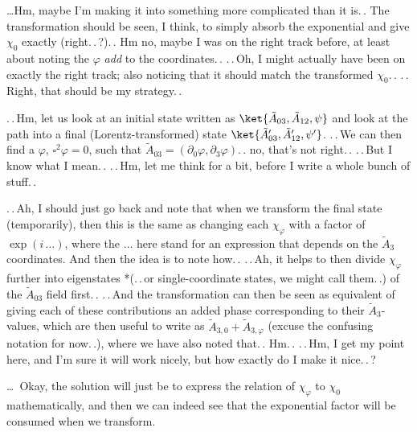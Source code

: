 \documentclass{report}
\begin{document}
\ldots Hm, maybe I'm making it into something more complicated than it is.\,. The transformation should be seen, I think, to simply absorb the exponential and give $\chi_0$ exactly (right.\,.\,?).\,. Hm no, maybe I was on the right track before, at least about noting the $\varphi$ \emph{add} to the coordinates.\,. .\,.\,Oh, I might actually have been on exactly the right track; also noticing that it should match the transformed $\chi_0$.\,. .\,.\,Right, that should be my strategy.\,. 

.\,.\,Hm, let us look at an initial state written as $\ket{\tilde A_{03}, \tilde A_{12}, \psi}$ and look at the path into a final (Lorentz-transformed) state $\ket{\tilde A_{03}', \tilde A_{12}', \psi'}$. .\,.\,We can then find a $\varphi$, $\square^2\varphi=0$, such that $\tilde A_{03} = (\partial_0 \varphi, \partial_3 \varphi)$.\,. no, that's not right.\,. .\,.\,But I know what I mean.\,. .\,.\,Hm, let me think for a bit, before I write a whole bunch of stuff.\,. 

.\,.\,Ah, I should just go back and note that when we transform the final state (temporarily), then this is the same as changing each $\chi_\varphi$ with a factor of $\exp(i\,\ldots)$, where the $\ldots$ here stand for an expression that depends on the $\tilde A_3$ coordinates. And then the idea is to note how.\,. .\,.\,Ah, it helps to then divide $\chi_\varphi$ further into eigenstates *(.\,.\,or single-coordinate states, we might call them.\,.) of the $\tilde A_{03}$ field first.\,. .\,.\,And the transformation can then be seen as equivalent of giving each of these contributions an added phase corresponding to their $\tilde A_{3}$-values, which are then useful to write as $\tilde A_{3,0} + \tilde A_{3,\varphi}$ (excuse the confusing notation for now.\,.), where we have also noted that.\,. Hm.\,. %
.\,.\,Hm, I get my point here, and I'm sure it will work nicely, but how exactly do I make it nice.\,.\,? %

\ldots\ Okay, the solution will just be to express the relation of $\chi_\varphi$ to $\chi_0$ mathematically, and then we can indeed see that the exponential factor will be consumed when we transform. 
\end{document}
